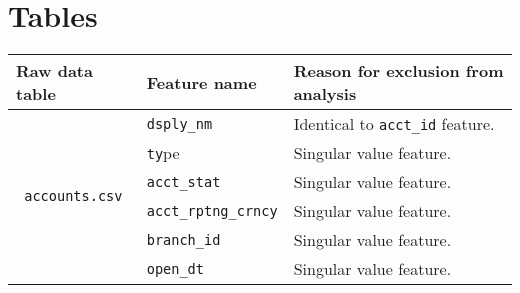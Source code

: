 \chapter{Tables} \label{app_1}

\begin{sidewaystable}[ht]
\begin{adjustbox}{center}
\begin{tabular}{cll}
\hline
\multicolumn{1}{l}{\textbf{Raw data table}} & \textbf{Feature name} & \textbf{Reason for exclusion from analysis}                                                                                                                                                                      \\ \hline
\multirow{9}{*}{\texttt{accounts.csv}}               & \texttt{dsply\_nm}             & Identical to \texttt{acct\_id} feature.                                                                                                                                                                                   \\
                                            & \texttt{ty}pe                  & Singular value feature.                                                                                                                                                                                          \\
                                            & \texttt{acct\_stat}            & Singular value feature.                                                                                                                                                                                          \\
                                            & \texttt{acct\_rptng\_crncy}    & Singular value feature.                                                                                                                                                                                          \\
                                            & \texttt{branch\_id}            & Singular value feature.                                                                                                                                                                                          \\
                                            & \texttt{open\_dt}              & Singular value feature.                                                                                                                                                                                          \\

\end{tabular}
\end{adjustbox}
\end{sidewaystable}
